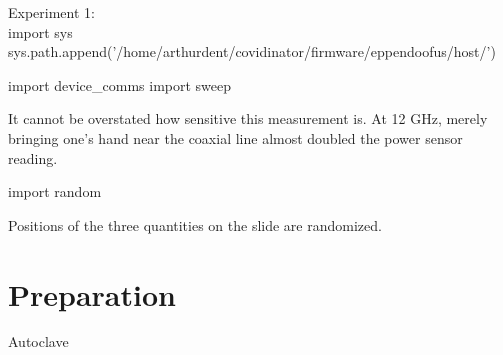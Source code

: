 \documentclass[paper.tex]{subfiles}%
\begin{document}
\clearpage
{\Large Experiment 1:}\\



\endmoddef\nwstartdeflinemarkup\nwenddeflinemarkup
import sys
sys.path.append('/home/arthurdent/covidinator/firmware/eppendoofus/host/')

import device_comms
import sweep

\nwendcode{}\nwdocspar

It cannot be overstated how sensitive this measurement is. At 12 GHz, merely bringing one's hand near the coaxial line almost doubled
the power sensor reading.

\nwenddocs{}\plusendmoddef\nwstartdeflinemarkup\nwenddeflinemarkup
import random

\nwendcode{}\nwdocspar

Positions of the three quantities on the slide are randomized\cite{first2000}.


\section{Preparation}

Autoclave


\nwenddocs{}\plusendmoddef\nwstartdeflinemarkup\nwenddeflinemarkup




\nwendcode{}\nwdocspar
\end{document}
